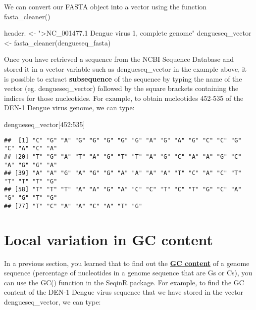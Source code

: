 \documentclass[
]{book}
\newenvironment{Shaded}{\begin{snugshade}}{\end{snugshade}}
\newcommand{\DecValTok}[1]{\textcolor[rgb]{0.00,0.00,0.81}{#1}}
\newcommand{\FunctionTok}[1]{\textcolor[rgb]{0.00,0.00,0.00}{#1}}
\newcommand{\NormalTok}[1]{#1}
\newcommand{\OtherTok}[1]{\textcolor[rgb]{0.56,0.35,0.01}{#1}}
\newcommand{\SpecialCharTok}[1]{\textcolor[rgb]{0.00,0.00,0.00}{#1}}
\newcommand{\StringTok}[1]{\textcolor[rgb]{0.31,0.60,0.02}{#1}}
\begin{document}
We can convert our FASTA object into a vector using the function fasta\_cleaner()

\begin{Shaded}
\begin{Highlighting}[]
\NormalTok{header. }\OtherTok{\textless{}{-}} \StringTok{"\textgreater{}NC\_001477.1 Dengue virus 1, complete genome"}
\NormalTok{dengueseq\_vector }\OtherTok{\textless{}{-}} \FunctionTok{fasta\_cleaner}\NormalTok{(dengueseq\_fasta)}
\end{Highlighting}
\end{Shaded}

Once you have retrieved a sequence from the NCBI Sequence Database and stored it in a vector variable such as dengueseq\_vector in the example above, it is possible to extract \textbf{subsequence} of the sequence by typing the name of the vector (eg. dengueseq\_vector) followed by the square brackets containing the indices for those nucleotides. For example, to obtain nucleotides 452-535 of the DEN-1 Dengue virus genome, we can type:

\begin{Shaded}
\begin{Highlighting}[]
\NormalTok{dengueseq\_vector[}\DecValTok{452}\SpecialCharTok{:}\DecValTok{535}\NormalTok{]}
\end{Highlighting}
\end{Shaded}

\begin{verbatim}
##  [1] "C" "G" "A" "G" "G" "G" "G" "G" "A" "G" "A" "G" "C" "C" "G" "C" "A" "C" "A"
## [20] "T" "G" "A" "T" "A" "G" "T" "T" "A" "G" "C" "A" "A" "G" "C" "A" "G" "G" "A"
## [39] "A" "A" "G" "A" "G" "G" "A" "A" "A" "A" "T" "C" "A" "C" "T" "T" "T" "T" "G"
## [58] "T" "T" "T" "A" "A" "G" "A" "C" "C" "T" "C" "T" "G" "C" "A" "G" "G" "T" "G"
## [77] "T" "C" "A" "A" "C" "A" "T" "G"
\end{verbatim}

\hypertarget{local-variation-in-gc-content-1}{%
\section{Local variation in GC content}\label{local-variation-in-gc-content-1}}

In a previous section, you learned that to find out the \href{https://en.wikipedia.org/wiki/GC-content}{\textbf{GC content}} of a genome sequence (percentage of nucleotides in a genome sequence that are Gs or Cs), you can use the GC() function in the SeqinR package. For example, to find the GC content of the DEN-1 Dengue virus sequence that we have stored in the vector dengueseq\_vector, we can type:
\end{document}
